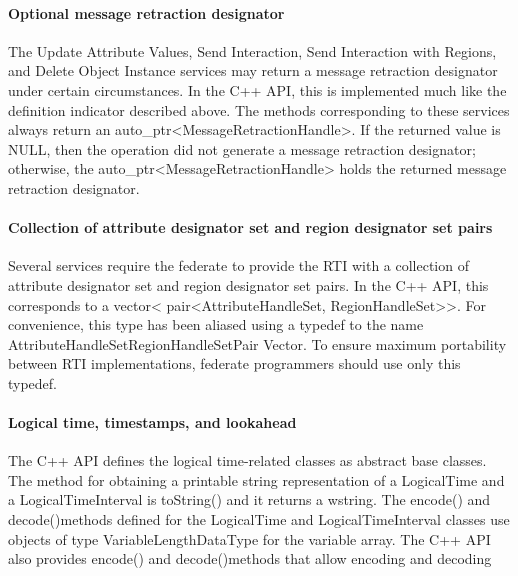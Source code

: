 \begin{compactstdpage}
    \paragraph{Optional message retraction designator}

    The Update Attribute Values, Send Interaction, Send Interaction with Regions, and Delete Object Instance services may return a message retraction designator under certain circumstances. In the C++ API, this is implemented much like the definition indicator described above. The methods corresponding to these services always return an auto\_ptr\textless{}\allowbreak MessageRetractionHandle\textgreater{}. If the returned value is NULL, then the operation did not generate a message retraction designator; otherwise, the auto\_ptr\textless{}\allowbreak MessageRetractionHandle\textgreater{} holds the returned message retraction designator.

    \paragraph{Collection of attribute designator set and region designator set pairs}

    Several services require the federate to provide the RTI with a collection of attribute designator set and region designator set pairs. In the C++ API, this corresponds to a vector\textless{} pair\textless{}AttributeHandleSet, RegionHandleSet\textgreater{}\textgreater{}. For convenience, this type has been aliased using a typedef to the name AttributeHandleSetRegionHandleSetPair Vector. To ensure maximum portability between RTI implementations, federate programmers should use only this typedef.

    \paragraph{Logical time, timestamps, and lookahead}

    The C++ API defines the logical time-related classes as abstract base classes. The method for obtaining a printable string representation of a LogicalTime and a LogicalTimeInterval is toString() and it returns a wstring. The encode() and decode()methods defined for the LogicalTime and LogicalTimeInterval classes use objects of type VariableLengthDataType for the variable array. The C++ API also provides encode() and decode()methods that allow encoding and decoding

\end{compactstdpage}

